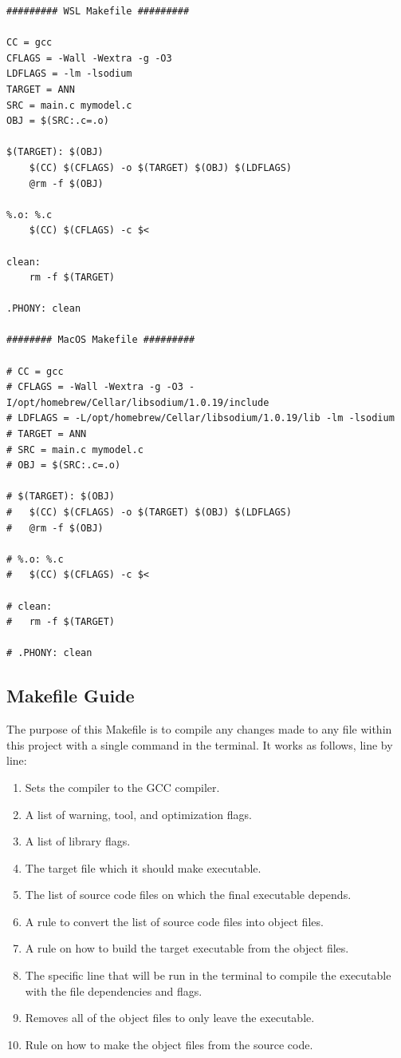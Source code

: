 \documentclass[12pt]{article}
\begin{document}
 	\begin{mdframed}[style=myboxstyleTerminal1]
		\begin{verbatim}
######### WSL Makefile #########

CC = gcc
CFLAGS = -Wall -Wextra -g -O3
LDFLAGS = -lm -lsodium
TARGET = ANN
SRC = main.c mymodel.c
OBJ = $(SRC:.c=.o)

$(TARGET): $(OBJ)
	$(CC) $(CFLAGS) -o $(TARGET) $(OBJ) $(LDFLAGS)
	@rm -f $(OBJ)

%.o: %.c
	$(CC) $(CFLAGS) -c $<

clean:
	rm -f $(TARGET)

.PHONY: clean

######## MacOS Makefile #########

# CC = gcc
# CFLAGS = -Wall -Wextra -g -O3 -I/opt/homebrew/Cellar/libsodium/1.0.19/include
# LDFLAGS = -L/opt/homebrew/Cellar/libsodium/1.0.19/lib -lm -lsodium
# TARGET = ANN
# SRC = main.c mymodel.c
# OBJ = $(SRC:.c=.o)

# $(TARGET): $(OBJ)
# 	$(CC) $(CFLAGS) -o $(TARGET) $(OBJ) $(LDFLAGS)
# 	@rm -f $(OBJ)

# %.o: %.c
# 	$(CC) $(CFLAGS) -c $<

# clean:
# 	rm -f $(TARGET)

# .PHONY: clean
		\end{verbatim}
	\end{mdframed}\textbf{}

 \subsection{Makefile Guide}

 The purpose of this Makefile is to compile any changes made to any file within this project with a single command  in the terminal. It works as follows, line by line:

\begin{enumerate}
    \item Sets the compiler to the GCC compiler.
    \item A list of warning, tool, and optimization flags.
    \item A list of library flags.
    \item The target file which it should make executable.
    \item The list of source code files on which the final executable depends.
    \item A rule to convert the list of source code files into object files.
    \item A rule on how to build the target executable from the object files.
    \item The specific line that will be run in the terminal to compile the executable with the file dependencies and flags.
    \item Removes all of the object files to only leave the executable.
    \item Rule on how to make the object files from the source code.
\end{enumerate}
\end{document}
